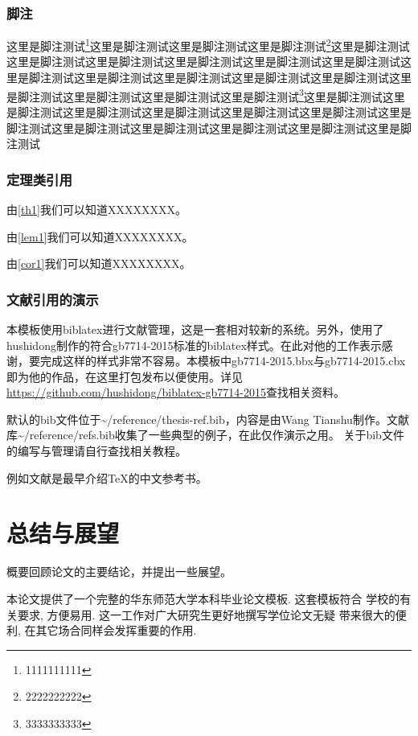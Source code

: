 \documentclass[12pt,a4paper,zihao=-4,UTF8]{book}
\begin{document}
\subsection{脚注}

这里是脚注测试\footnote{1111111111}这里是脚注测试这里是脚注测试这里是脚注测试\footnote{2222222222}这里是脚注测试这里是脚注测试这里是脚注测试这里是脚注测试这里是脚注测试这里是脚注测试这里是脚注测试这里是脚注测试这里是脚注测试这里是脚注测试这里是脚注测试这里是脚注测试这里是脚注测试这里是脚注测试这里是脚注测试\footnote{3333333333}这里是脚注测试这里是脚注测试这里是脚注测试这里是脚注测试这里是脚注测试这里是脚注测试这里是脚注测试这里是脚注测试这里是脚注测试这里是脚注测试这里是脚注测试这里是脚注测试

\subsection{定理类引用}

由\cref{th1}我们可以知道XXXXXXXX。

由\cref{lem1}我们可以知道XXXXXXXX。

由\cref{cor1}我们可以知道XXXXXXXX。

\subsection{文献引用的演示}

本模板使用biblatex进行文献管理，这是一套相对较新的系统。另外，使用了hushidong制作的符合gb7714-2015标准的biblatex样式。在此对他的工作表示感谢，要完成这样的样式非常不容易。本模板中gb7714-2015.bbx与gb7714-2015.cbx即为他的作品，在这里打包发布以便使用。详见\url{https://github.com/hushidong/biblatex-gb7714-2015}查找相关资料。

默认的bib文件位于\textasciitilde{}/reference/thesis-ref.bib，内容是由Wang
Tianshu制作。文献库\textasciitilde{}/reference/refs.bib收集了一些典型的例子，在此仅作演示之用。
关于bib文件的编写与管理请自行查找相关教程。

例如文献\cite{Xiedy:1997}是最早介绍\TeX{}的中文参考书。

\nocite{*}

\chapter{总结与展望}

概要回顾论文的主要结论，并提出一些展望。

本论文提供了一个完整的华东师范大学本科毕业论文模板. 这套模板符合
学校的有关要求, 方便易用. 这一工作对广大研究生更好地撰写学位论文无疑
带来很大的便利, 在其它场合同样会发挥重要的作用.
\end{document}
